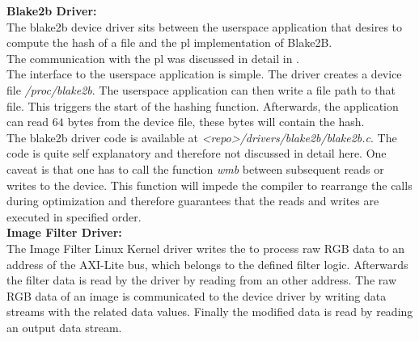 
\textbf{Blake2b Driver:}\\
The blake2b device driver sits between the userspace application that desires to
compute the hash of a file and the \gls{pl} implementation of Blake2B.\\
The communication with the \gls{pl} was discussed in detail in
.\\
The interface to the userspace application is simple.
The driver creates a device file \emph{/proc/blake2b}.
The userspace application can then write a file path to that file.
This triggers the start of the hashing function.
Afterwards, the application can read $64$ bytes from the device file, these
bytes will contain the hash.\\
The blake2b driver code is available at \emph{<repo>/drivers/blake2b/blake2b.c}.
The code is quite self explanatory and therefore not discussed in detail here.
One caveat is that one has to call the function \emph{wmb} between subsequent
reads or writes to the device.
This function will impede the compiler to rearrange the calls during
optimization and therefore guarantees that the reads and writes are executed in
specified order.
\\
\textbf{Image Filter Driver:}\\
The Image Filter Linux Kernel driver writes the to process raw RGB data to an address of the AXI-Lite bus, which belongs to the defined filter logic. Afterwards the filter data is read by the driver by reading from an other address. The raw RGB data of an image is communicated to the device driver by writing data streams with the related data values. Finally the modified data is read by reading an output data stream.\\

